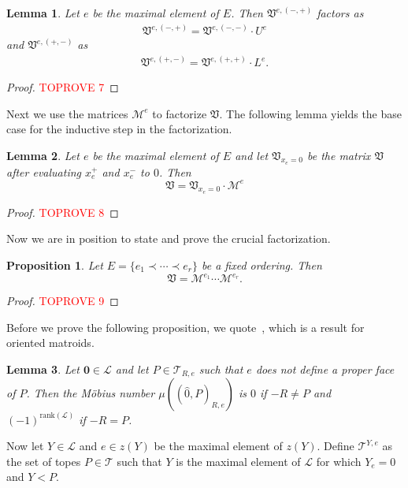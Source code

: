 \documentclass[12pt]{amsart}
\def\Var{{\mathfrak V}}
\def\Tscr{{\mathcal T}}
\def\rank{{\mathrm{rank}}}
\theoremstyle{plain}
\newtheorem{Lemma}{Lemma}
\numberwithin{Lemma}{\DefaultNumberTheoremWithin}
\numberwithin{Claim}{\DefaultNumberTheoremWithin}
\numberwithin{Theorem}{\DefaultNumberTheoremWithin}
\numberwithin{Corollary}{\DefaultNumberTheoremWithin}
\newtheorem{Proposition}{Proposition}
\numberwithin{Proposition}{\DefaultNumberTheoremWithin}
\numberwithin{Conjecture}{\DefaultNumberTheoremWithin}
\numberwithin{Situation}{\DefaultNumberTheoremWithin}
\numberwithin{Note}{\DefaultNumberTheoremWithin}
\theoremstyle{definition}
\numberwithin{Definition}{\DefaultNumberTheoremWithin}
\theoremstyle{definition}
\numberwithin{Question}{\DefaultNumberTheoremWithin}
\theoremstyle{definition}
\numberwithin{Problem}{\DefaultNumberTheoremWithin}
\theoremstyle{remark} \newtheorem{Remark}{Remark}
\numberwithin{Remark}{\DefaultNumberTheoremWithin}
\theoremstyle{remark}
\numberwithin{Example}{\DefaultNumberTheoremWithin}
\numberwithin{Case}{Lemma}
\numberwithin{Step}{Lemma}
\begin{document}
\begin{Lemma}\label{lem:fac1}
   Let $e$ be the maximal element of $E$. Then 
   $\Var^{e,(-,+)}$ factors as
   \begin{align}\label{equ:minus}
      \Var^{e,(-,+)} = \Var^{e,(-,-)} \cdot U^e
   \end{align}
   and $\Var^{e,(+,-)}$ as
   \begin{align}\label{equ:plus}
      \Var^{e,(+,-)} = \Var^{e,(+,+)} \cdot L^e.
   \end{align}
\end{Lemma}
\begin{proof}\textcolor{red}{TOPROVE 7}\end{proof}

Next we use the matrices $\mathcal{M}^e$ to factorize $\Var$. 
The following lemma yields the base case for the inductive step in the 
factorization.

\begin{Lemma}
  \label{lem:fac}
  Let $e$ be the maximal element of $E$ and
  let $\Var_{x_e = 0}$ be the matrix $\Var$ after
  evaluating $x_{e}^+$ and $x_{e}^-$ to $0$. 
  Then 
  $$\Var = \Var_{x_e = 0} \cdot \mathcal{M}^e 
  $$
\end{Lemma}
\begin{proof}\textcolor{red}{TOPROVE 8}\end{proof}

Now we are in position to state and prove the crucial factorization.

\begin{Proposition}
  \label{pro:fac}
  Let $E = \{ e_1 \prec \cdots \prec e_r\}$ be a fixed
  ordering. Then 
  $$\Var = \mathcal{M}^{e_1} \cdots \mathcal{M}^{e_r}.$$ 
\end{Proposition}
\begin{proof}\textcolor{red}{TOPROVE 9}\end{proof}
Before we prove the following proposition, we quote~\cite[Corollary 3]{WH}, which is a result for oriented matroids.

\begin{Lemma}\label{lem:moebius}
Let $\mathbf{0} \in \mathcal{L}$ and let $P \in \Tscr_{R,e}$ such that $e$ does not define a proper face of $P$.
  Then the M\"obius 
  number 
  $\mu((\hat{0},P)_{R,e})$ is $0$ if $-R \neq P$ and   
  $(-1)^{\rank(\mathcal{L})}$ if $-R = P$. 
\end{Lemma}

Now let $Y \in \mathcal{L}$ and $e \in z(Y)$ be the maximal element of
$z(Y)$. Define $\Tscr^{Y,e}$ as the set of topes $P \in \Tscr$
such that $Y$ is the maximal element of $\mathcal{L}$ for which $Y_e = 0$ and $Y < P$.
	 
\end{document}
